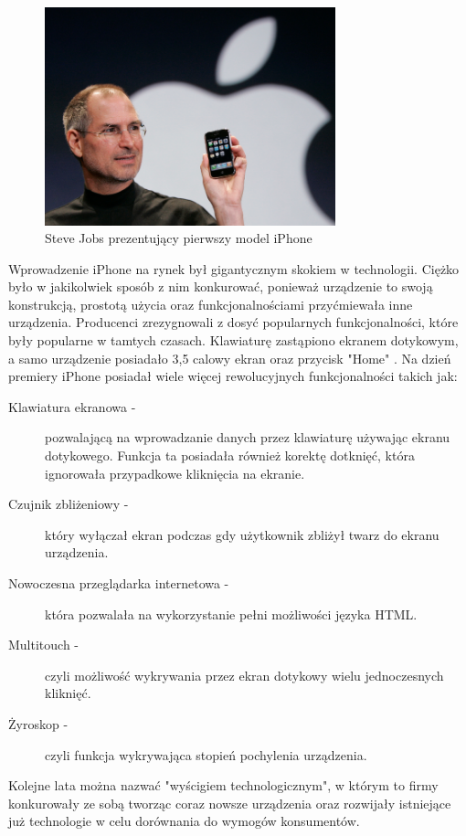 \documentclass[a4paper,12pt,oneside]{book}
\begin{document}
	\begin{figure}[h]
		\centering
		\includegraphics[width=0.75\textwidth]{grafika/steve_jobs_iphone_presentation.png}
		\caption{Steve Jobs prezentujący pierwszy model iPhone}
	\end{figure}
	
	Wprowadzenie iPhone na rynek był gigantycznym skokiem w technologii. Ciężko było w jakikolwiek sposób z nim konkurować, ponieważ urządzenie to swoją konstrukcją, prostotą użycia oraz funkcjonalnościami przyćmiewała inne urządzenia. Producenci zrezygnowali z dosyć popularnych funkcjonalności, które były popularne w tamtych czasach. Klawiaturę zastąpiono ekranem dotykowym, a samo urządzenie posiadało 3,5 calowy ekran oraz przycisk "Home" \cite{ref2}. 
	\newpage
	Na dzień premiery iPhone posiadał wiele więcej rewolucyjnych funkcjonalności takich jak:
	
	\begin{description}
		\item[Klawiatura ekranowa -] pozwalającą na wprowadzanie danych przez klawiaturę używając ekranu dotykowego. Funkcja ta posiadała również korektę dotknięć, która ignorowała przypadkowe kliknięcia na ekranie.
		\item[Czujnik zbliżeniowy -] który wyłączał ekran podczas gdy użytkownik zbliżył twarz do ekranu urządzenia.
		\item[Nowoczesna przeglądarka internetowa -] która pozwalała na wykorzystanie pełni możliwości języka HTML.
		\item[Multitouch -] czyli możliwość wykrywania przez ekran dotykowy wielu jednoczesnych kliknięć.
		\item[Żyroskop -] czyli funkcja wykrywająca stopień pochylenia urządzenia. 
	\end{description}

	Kolejne lata można nazwać "wyścigiem technologicznym", w którym to firmy konkurowały ze sobą tworząc coraz nowsze urządzenia oraz rozwijały istniejące już technologie w celu dorównania do wymogów konsumentów.
	
\end{document}

